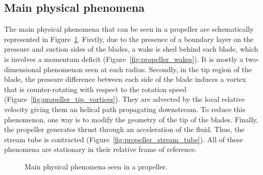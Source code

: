 \subsection{Main physical phenomena}
\label{sub:cror_propeller_physics}

The main physical phenomena that can be seen in a propeller are schematically represented
in Figure~\ref{fig:propeller_phys_phenomena}. Firstly, due to the presence of a boundary
layer on the pressure and suction sides of the blades, a wake is shed behind each blade, which
is involves a momentum deficit (Figure~\ref{fig:propeller_wakes}). 
It is mostly a two-dimensional
phenomenon seen at each radius. Secondly, 
in the tip region of the blade, the pressure difference between each 
side of the blade induces a vortex that is counter-rotating with respect to 
the rotation speed (Figure~\ref{fig:propeller_tip_vortices}). 
They are advected by the local relative velocity giving them
an helical path propagating downstream.
To reduce this phenomenon, one way is to modify the geometry of the tip
of the blades.
Finally, the propeller generates thrust through an acceleration of the fluid. Thus, the stream
tube is contracted (Figure~\ref{fig:propeller_stream_tube}). 
All of these phenomena are stationary in their relative frame of reference.
\begin{figure}[htp]
  \centering
  \quad{}
  \quad{}
  \caption{Main physical phenomena seen in a propeller.}
  \label{fig:propeller_phys_phenomena}
\end{figure}
